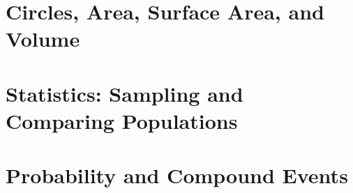 \documentclass[12pt, fleqn, openany, oneside]{studyGuide}
\begin{document}
\chapter{Circles, Area, Surface Area, and Volume}








\chapter{Statistics: Sampling and Comparing Populations}






\chapter{Probability and Compound Events}









\printAnswerKey
\end{document}
